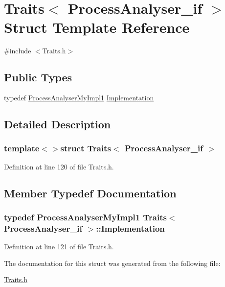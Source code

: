 \hypertarget{struct_traits_3_01_process_analyser__if_01_4}{\section{Traits$<$ Process\-Analyser\-\_\-if $>$ Struct Template Reference}
\label{struct_traits_3_01_process_analyser__if_01_4}
}


{\ttfamily \#include $<$Traits.\-h$>$}

\subsection*{Public Types}
\begin{DoxyCompactItemize}
\item 
typedef \hyperlink{class_process_analyser_my_impl1}{Process\-Analyser\-My\-Impl1} \hyperlink{struct_traits_3_01_process_analyser__if_01_4_a07937b53ae16bb3a41301a0393ac679f}{Implementation}
\end{DoxyCompactItemize}


\subsection{Detailed Description}
\subsubsection*{template$<$$>$struct Traits$<$ Process\-Analyser\-\_\-if $>$}



Definition at line 120 of file Traits.\-h.



\subsection{Member Typedef Documentation}
\hypertarget{struct_traits_3_01_process_analyser__if_01_4_a07937b53ae16bb3a41301a0393ac679f}{
\subsubsection[{Implementation}]{\setlength{\rightskip}{0pt plus 5cm}typedef {\bf Process\-Analyser\-My\-Impl1} {\bf Traits}$<$ {\bf Process\-Analyser\-\_\-if} $>$\-::{\bf Implementation}}}\label{struct_traits_3_01_process_analyser__if_01_4_a07937b53ae16bb3a41301a0393ac679f}


Definition at line 121 of file Traits.\-h.



The documentation for this struct was generated from the following file\-:\begin{DoxyCompactItemize}
\item 
\hyperlink{_traits_8h}{Traits.\-h}\end{DoxyCompactItemize}
